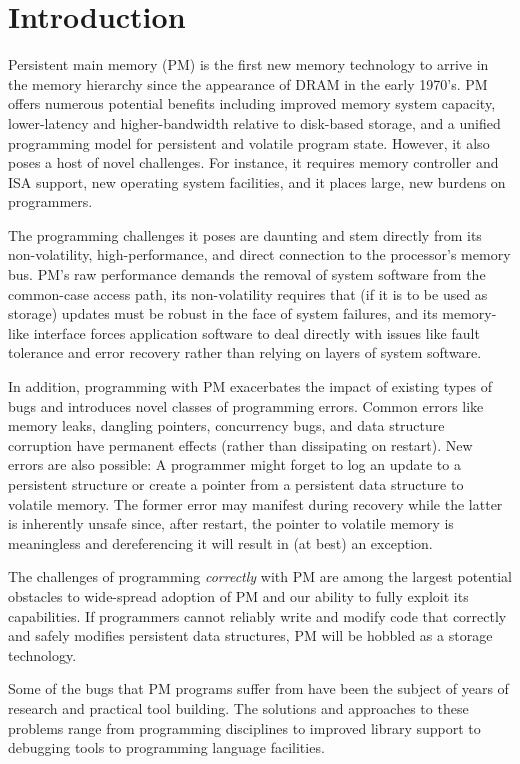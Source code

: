 \section{Introduction}
\label{sec:introduction}

Persistent main memory (PM) is the first new memory technology to arrive in
the memory hierarchy since the appearance of DRAM in the early 1970's.  PM offers
numerous potential benefits including improved memory system capacity,
lower-latency and higher-bandwidth relative to disk-based storage, and a unified programming model for
persistent and volatile program state.  However, it also poses a host of novel
challenges.  For instance, it requires memory controller and ISA support, new operating
system facilities, and it places large, new burdens on programmers.

The programming challenges it poses are daunting and stem directly from its
non-volatility, high-performance, and direct connection to the processor's
memory bus.  PM's raw performance demands the removal of system
software from the common-case access path, its non-volatility requires that (if
it is to be used as storage) updates must be robust in the face of system failures,
and its memory-like interface forces application software to deal directly with issues
like fault tolerance and error recovery rather than relying on layers of system software.

In addition, programming with PM exacerbates the impact of existing types of
bugs and introduces novel classes of programming errors.  Common
errors like memory leaks, dangling pointers, concurrency bugs, and data structure corruption have
permanent effects (rather than dissipating on restart).
New errors are also possible: A programmer might forget to log an update to a
persistent structure or create a pointer from a persistent data structure to
volatile memory.  The former error may manifest during recovery
while the latter is inherently unsafe since, after restart, the pointer to
volatile memory is meaningless and dereferencing it will result in (at best) an
exception.

The challenges of programming \emph{correctly} with PM are among the largest
potential obstacles to wide-spread adoption of PM and our ability to fully
exploit its capabilities.  If programmers cannot reliably write and modify code
that correctly and safely modifies persistent data structures, PM will be
hobbled as a storage technology.

Some of the bugs that PM programs suffer from have been the subject of
years of research and practical tool building.  The solutions and approaches to
these problems range from programming disciplines to improved library support
to debugging tools to programming language facilities.

